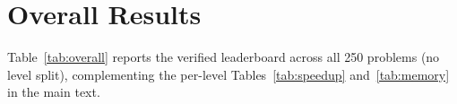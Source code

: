 \documentclass[]{fairmeta}
\begin{document}








\section{Overall Results}
\label{app:overall}

Table~\ref{tab:overall} reports the verified leaderboard across all 250 problems (no level split), complementing the per-level Tables~\ref{tab:speedup} and~\ref{tab:memory} in the main text.
\end{document}
